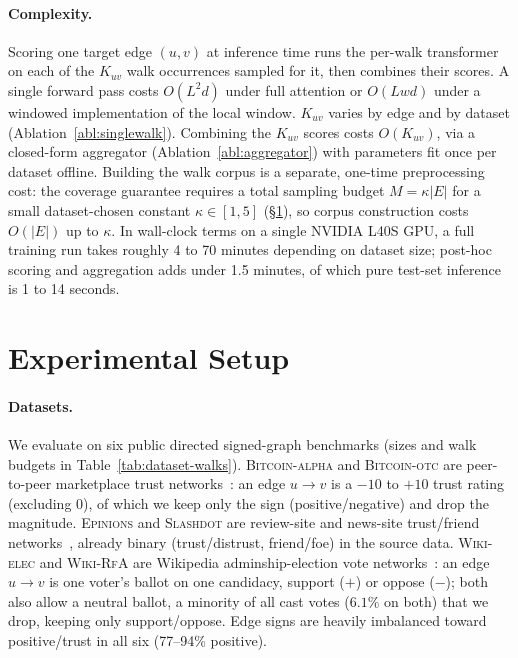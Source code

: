 \documentclass[sigconf]{acmart}
\theoremstyle{plain}
\theoremstyle{definition}
\begin{document}
\paragraph{Complexity.}
\label{sec:complexity}
Scoring one target edge $(u,v)$ at inference time runs the per-walk transformer on each of the $K_{uv}$ walk occurrences sampled for it, then combines their scores. A single forward pass costs $O(L^2d)$ under full attention or $O(Lwd)$ under a windowed implementation of the local window. $K_{uv}$ varies by edge and by dataset (Ablation~\ref{abl:singlewalk}). Combining the $K_{uv}$ scores costs $O(K_{uv})$, via a closed-form aggregator (Ablation~\ref{abl:aggregator}) with parameters fit once per dataset offline. Building the walk corpus is a separate, one-time preprocessing cost: the coverage guarantee requires a total sampling budget $M=\kappa|E|$ for a small dataset-chosen constant $\kappa\in[1,5]$ (\S\ref{sec:setup}), so corpus construction costs $O(|E|)$ up to $\kappa$. In wall-clock terms on a single NVIDIA L40S GPU, a full training run takes roughly 4 to 70 minutes depending on dataset size; post-hoc scoring and aggregation adds under 1.5 minutes, of which pure test-set inference is 1 to 14 seconds.

\section{Experimental Setup}
\label{sec:setup}
\paragraph{Datasets.} We evaluate on six public directed signed-graph benchmarks (sizes and walk budgets in Table~\ref{tab:dataset-walks}). \textsc{Bitcoin-alpha} and \textsc{Bitcoin-otc} are peer-to-peer marketplace trust networks~\citep{kumar2016edge, kumar2018rev2}: an edge $u\to v$ is a $-10$ to $+10$ trust rating (excluding $0$), of which we keep only the sign (positive/negative) and drop the magnitude. \textsc{Epinions} and \textsc{Slashdot} are review-site and news-site trust/friend networks~\citep{leskovec2010signed}, already binary (trust/distrust, friend/foe) in the source data. \textsc{Wiki-elec} and \textsc{Wiki-RfA} are Wikipedia adminship-election vote networks~\citep{leskovec2010signed, leskovec2010predicting, west2014exploiting}: an edge $u\to v$ is one voter's ballot on one candidacy, support ($+$) or oppose ($-$); both also allow a neutral ballot, a minority of all cast votes ($6.1\%$ on both) that we drop, keeping only support/oppose. Edge signs are heavily imbalanced toward positive/trust in all six (77--94\% positive).
\end{document}
